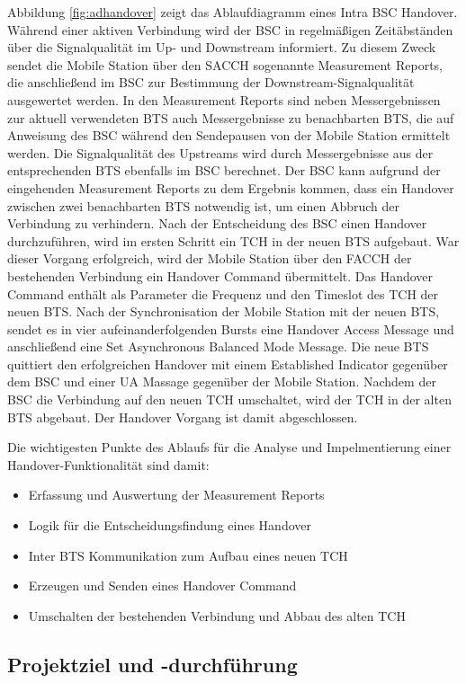 Abbildung \ref{fig:adhandover} zeigt das Ablaufdiagramm eines Intra BSC Handover. Während einer aktiven Verbindung wird der BSC in regelmäßigen Zeitäbständen über die Signalqualität im Up- und Downstream informiert. Zu diesem Zweck sendet die Mobile Station über den SACCH sogenannte Measurement Reports, die anschließend im BSC zur Bestimmung der Downstream-Signalqualität ausgewertet werden. In den Measurement Reports sind neben Messergebnissen zur aktuell verwendeten BTS auch Messergebnisse zu benachbarten BTS, die auf Anweisung des BSC während den Sendepausen von der Mobile Station ermittelt werden. Die Signalqualität des Upstreams wird durch Messergebnisse aus der entsprechenden BTS ebenfalls im BSC berechnet. Der BSC kann aufgrund der eingehenden Measurement Reports zu dem Ergebnis kommen, dass ein Handover zwischen zwei benachbarten BTS notwendig ist, um einen Abbruch der Verbindung zu verhindern. Nach der Entscheidung des BSC einen Handover durchzuführen, wird im ersten Schritt ein TCH in der neuen BTS aufgebaut. War dieser Vorgang erfolgreich, wird der Mobile Station über den FACCH der bestehenden Verbindung ein Handover Command übermittelt. Das Handover Command enthält als Parameter die Frequenz und den Timeslot des TCH der neuen BTS. Nach der Synchronisation der Mobile Station mit der neuen BTS, sendet es in vier aufeinanderfolgenden Bursts eine Handover Access Message und anschließend eine Set Asynchronous Balanced Mode Message. Die neue BTS quittiert den erfolgreichen Handover mit einem Established Indicator gegenüber dem BSC und einer UA Massage gegenüber der Mobile Station. Nachdem der BSC die Verbindung auf den neuen TCH umschaltet, wird der TCH in der alten BTS abgebaut. Der Handover Vorgang ist damit abgeschlossen.

Die wichtigesten Punkte des Ablaufs für die Analyse und Impelmentierung einer Handover-Funktionalität sind damit:

\begin{itemize}
 \item Erfassung und Auswertung der Measurement Reports
 \item Logik für die Entscheidungsfindung eines Handover
 \item Inter BTS Kommunikation zum Aufbau eines neuen TCH
 \item Erzeugen und Senden eines Handover Command
 \item Umschalten der bestehenden Verbindung und Abbau des alten TCH
\end{itemize}

\subsection{Projektziel und -durchführung}

